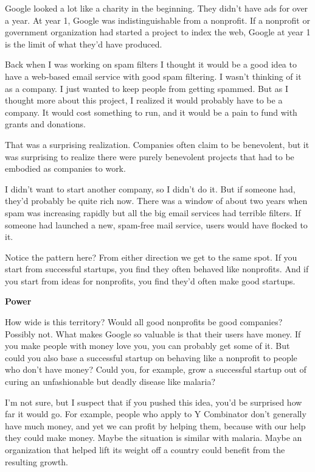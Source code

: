 Google looked a lot like a charity in the beginning. They didn't have
ads for over a year. At year 1, Google was indistinguishable from a
nonprofit. If a nonprofit or government organization had started a
project to index the web, Google at year 1 is the limit of what they'd
have produced.

Back when I was working on spam filters I thought it would be a good
idea to have a web-based email service with good spam filtering. I
wasn't thinking of it as a company. I just wanted to keep people from
getting spammed. But as I thought more about this project, I realized it
would probably have to be a company. It would cost something to run, and
it would be a pain to fund with grants and donations.

That was a surprising realization. Companies often claim to be
benevolent, but it was surprising to realize there were purely
benevolent projects that had to be embodied as companies to work.

I didn't want to start another company, so I didn't do it. But if
someone had, they'd probably be quite rich now. There was a window of
about two years when spam was increasing rapidly but all the big email
services had terrible filters. If someone had launched a new, spam-free
mail service, users would have flocked to it.

Notice the pattern here? From either direction we get to the same spot.
If you start from successful startups, you find they often behaved like
nonprofits. And if you start from ideas for nonprofits, you find they'd
often make good startups.

\textbf{Power}

How wide is this territory? Would all good nonprofits be good companies?
Possibly not. What makes Google so valuable is that their users have
money. If you make people with money love you, you can probably get some
of it. But could you also base a successful startup on behaving like a
nonprofit to people who don't have money? Could you, for example, grow a
successful startup out of curing an unfashionable but deadly disease
like malaria?

I'm not sure, but I suspect that if you pushed this idea, you'd be
surprised how far it would go. For example, people who apply to Y
Combinator don't generally have much money, and yet we can profit by
helping them, because with our help they could make money. Maybe the
situation is similar with malaria. Maybe an organization that helped
lift its weight off a country could benefit from the resulting growth.


